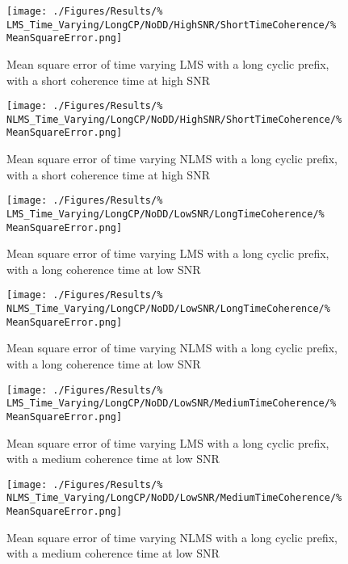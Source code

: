\begin{figure}[ht]
	\centering
	\begin{minipage}{0.49\textwidth}
		\centering
		\texttt{[image: ./Figures/Results/\%
	LMS\_Time\_Varying/LongCP/NoDD/HighSNR/ShortTimeCoherence/\%
	MeanSquareError.png]}
		\captionsetup{width=0.75\linewidth}
		\caption{Mean square error of time varying LMS with a 
		long cyclic prefix, with a short coherence time at 
		high SNR}
		\label{fig:LMS-Short-High-None}
	\end{minipage}
	\begin{minipage}{0.49\textwidth}
		\centering
		\texttt{[image: ./Figures/Results/\%
	NLMS\_Time\_Varying/LongCP/NoDD/HighSNR/ShortTimeCoherence/\%
	MeanSquareError.png]}
		\captionsetup{width=0.75\linewidth}
		\caption{Mean square error of time varying NLMS with 
		a long cyclic prefix, with a short coherence time 
		at high SNR}
	\end{minipage}
\end{figure}

\begin{figure}[ht]
	\centering
	\begin{minipage}{0.49\textwidth}
		\centering
		\texttt{[image: ./Figures/Results/\%
	LMS\_Time\_Varying/LongCP/NoDD/LowSNR/LongTimeCoherence/\%
	MeanSquareError.png]}
		\captionsetup{width=0.75\linewidth}
		\caption{Mean square error of time varying LMS with a 
		long cyclic prefix, with a long coherence time at 
		low SNR}
	\end{minipage}
	\begin{minipage}{0.49\textwidth}
		\centering
		\texttt{[image: ./Figures/Results/\%
	NLMS\_Time\_Varying/LongCP/NoDD/LowSNR/LongTimeCoherence/\%
	MeanSquareError.png]}
		\captionsetup{width=0.75\linewidth}
		\caption{Mean square error of time varying NLMS with 
		a long cyclic prefix, with a long coherence time 
		at low SNR}
		\label{fig:NLMS-Long-Low-None-Long}
	\end{minipage}
\end{figure}

\begin{figure}[ht]
	\centering
	\begin{minipage}{0.49\textwidth}
		\centering
		\texttt{[image: ./Figures/Results/\%
	LMS\_Time\_Varying/LongCP/NoDD/LowSNR/MediumTimeCoherence/\%
	MeanSquareError.png]}
		\captionsetup{width=0.75\linewidth}
		\caption{Mean square error of time varying LMS with a 
		long cyclic prefix, with a medium coherence time at 
		low SNR}
	\end{minipage}
	\begin{minipage}{0.49\textwidth}
		\centering
		\texttt{[image: ./Figures/Results/\%
	NLMS\_Time\_Varying/LongCP/NoDD/LowSNR/MediumTimeCoherence/\%
	MeanSquareError.png]}
		\captionsetup{width=0.75\linewidth}
		\caption{Mean square error of time varying NLMS with 
		a long cyclic prefix, with a medium coherence time 
		at low SNR}
	\end{minipage}
\end{figure}

